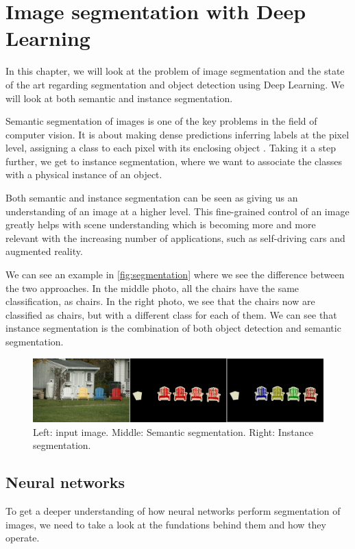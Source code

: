 \chapter{Image segmentation with Deep Learning}
In this chapter, we will look at the problem of image segmentation and the state of the art regarding segmentation and object detection using Deep Learning. We will look at both semantic and instance segmentation.

Semantic segmentation of images is one of the key problems in the field of computer vision. It is about making dense predictions inferring labels at the pixel level, assigning a class to each pixel with its enclosing object \cite{Garcia-Garcia2017}. Taking it a step further, we get to instance segmentation, where we want to associate the classes with a physical instance of an object. 

Both semantic and instance segmentation can be seen as giving us an understanding of an image at a higher level. This fine-grained control of an image greatly helps with scene understanding which is becoming more and more relevant with the increasing number of applications, such as self-driving cars and augmented reality. 

We can see an example in \autoref{fig:segmentation} where we see the difference between the two approaches. In the middle photo, all the chairs have the same classification, as chairs. In the right photo, we see that the chairs now are classified as chairs, but with a different class for each of them. We can see that instance segmentation is the combination of both object detection and semantic segmentation.

\begin{figure}[H]
	\centering
	\includegraphics[width=0.8\linewidth]{fig/se.png}
	\caption{Left: input image. Middle: Semantic segmentation. Right: Instance segmentation. \cite{PASCALVOC2012}}
	\label{fig:segmentation}
\end{figure}


\section{Neural networks}
To get a deeper understanding of how neural networks perform segmentation of images, we need to take a look at the fundations behind them and how they operate.

